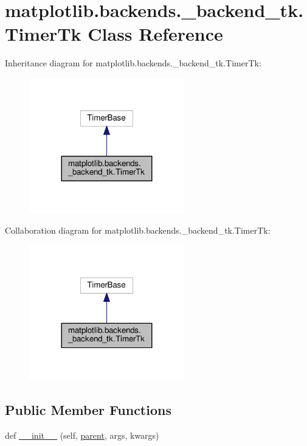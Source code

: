 \hypertarget{classmatplotlib_1_1backends_1_1__backend__tk_1_1TimerTk}{}\section{matplotlib.\+backends.\+\_\+backend\+\_\+tk.\+Timer\+Tk Class Reference}
\label{classmatplotlib_1_1backends_1_1__backend__tk_1_1TimerTk}


Inheritance diagram for matplotlib.\+backends.\+\_\+backend\+\_\+tk.\+Timer\+Tk\+:
\nopagebreak
\begin{figure}[H]
\begin{center}
\leavevmode
\includegraphics[width=191pt]{classmatplotlib_1_1backends_1_1__backend__tk_1_1TimerTk__inherit__graph}
\end{center}
\end{figure}


Collaboration diagram for matplotlib.\+backends.\+\_\+backend\+\_\+tk.\+Timer\+Tk\+:
\nopagebreak
\begin{figure}[H]
\begin{center}
\leavevmode
\includegraphics[width=191pt]{classmatplotlib_1_1backends_1_1__backend__tk_1_1TimerTk__coll__graph}
\end{center}
\end{figure}
\subsection*{Public Member Functions}
\begin{DoxyCompactItemize}
\item 
def \hyperlink{classmatplotlib_1_1backends_1_1__backend__tk_1_1TimerTk_a58e2c68e94c09e892b92ea757facac60}{\+\_\+\+\_\+init\+\_\+\+\_\+} (self, \hyperlink{classmatplotlib_1_1backends_1_1__backend__tk_1_1TimerTk_afb49c7b161ebbc16c9eb4b56117e5e06}{parent}, args, kwargs)
\end{DoxyCompactItemize}
